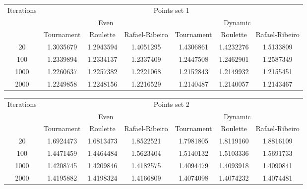 \begin{center}
	\begin{tabular}{|c|c|c|c|c|c|c|}
		\hline
		\multirow{3}{*}{Iterations}	&	\multicolumn{6}{c|}{Points set 1}	\\
										\cline{2-7}
									&	\multicolumn{3}{c|}{Even}	& \multicolumn{3}{c|}{Dynamic} \\
										\cline{2-7}
									&	Tournament		&	Roulette		&	Rafael-Ribeiro	&	Tournament		&	Roulette		&	Rafael-Ribeiro		\\
		\hline
		20							&	1.3035679		& 	1.2943594		&	1.4051295		&	1.4306861		&	1.4232276		&	1.5133809			\\
		\hline
		100							&	1.2339894		&	1.2334137		&	1.2337409		&	1.2447508		&	1.2462901		&	1.2587349			\\
		\hline
		1000						&	1.2260637		&	1.2257382		&	1.2221068		&	1.2152843		&	1.2149932		&	1.2155451			\\
		\hline
		2000						&	1.2249858		&	1.2248156		&	1.2216529		&	1.2140487		&	1.2140057		&	1.2143467			\\
		\hline
	\end{tabular}
	\label{tab:selection_type_1}
\end{center}

\begin{center}
	\begin{tabular}{|c|c|c|c|c|c|c|}
		\hline
		\multirow{3}{*}{Iterations}	&	\multicolumn{6}{c|}{Points set 2}	\\
										\cline{2-7}
									&	\multicolumn{3}{c|}{Even}	& \multicolumn{3}{c|}{Dynamic} \\
										\cline{2-7}
									&	Tournament		&	Roulette		&	Rafael-Ribeiro	&	Tournament		&	Roulette		&	Rafael-Ribeiro		\\
		\hline
		20							&	1.6924473		&	1.6813473		&	1.8522521		&	1.7981805		&	1.8119160		&	1.8816109			\\
		\hline
		100							&	1.4471459		&	1.4464484		&	1.5623404		&	1.5140132		&	1.5103336		&	1.5691733			\\
		\hline
		1000						&	1.4208745		&	1.4209846		&	1.4182575		&	1.4094479		&	1.4093918		&	1.4090841			\\
		\hline	
		2000						&	1.4195882		&	1.4198324		&	1.4166809		&	1.4074098		&	1.4074232		&	1.4074481			\\
		\hline
	\end{tabular}
	\label{tab:selection_type_2}
\end{center}
